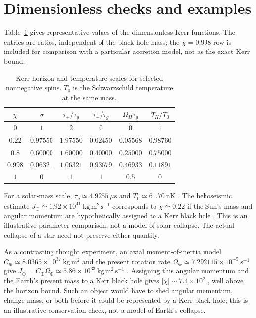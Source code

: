 \documentclass[12pt]{article}
\begin{document}
\section{Dimensionless checks and examples}

Table~\ref{tab:spin-values} gives representative values of the dimensionless Kerr functions. The entries are ratios, independent of the black-hole mass; the $\chi=0.998$ row is included for comparison with a particular accretion model, not as the exact Kerr bound.

\begin{table}[ht]
  \centering
  \small
  \caption{Kerr horizon and temperature scales for selected nonnegative spins. $T_0$ is the Schwarzschild temperature at the same mass.}
  \label{tab:spin-values}
  \begin{tabular}{cccccc}
    \toprule
    $\chi$ & $\sigma$ & $\tau_+/\tau_g$ & $\tau_-/\tau_g$ & $\Omega_H\tau_g$ & $T_H/T_0$ \\
    \midrule
    $0$ & $1$ & $2$ & $0$ & $0$ & $1$ \\
    $0.22$ & $0.97550$ & $1.97550$ & $0.02450$ & $0.05568$ & $0.98760$ \\
    $0.8$ & $0.60000$ & $1.60000$ & $0.40000$ & $0.25000$ & $0.75000$ \\
    $0.998$ & $0.06321$ & $1.06321$ & $0.93679$ & $0.46933$ & $0.11891$ \\
    $1$ & $0$ & $1$ & $1$ & $0.5$ & $0$ \\
    \bottomrule
  \end{tabular}
\end{table}

For a solar-mass scale, $\tau_g\simeq4.9255\ \mu\mathrm{s}$ and $T_0\simeq61.70\ \mathrm{nK}$ \cite{JPL}. The helioseismic estimate $J_\odot\simeq1.92\times10^{41}\ \mathrm{kg\,m^2\,s^{-1}}$ corresponds to $\chi\simeq0.22$ if the Sun's mass and angular momentum are hypothetically assigned to a Kerr black hole \cite{Iorio,JPL,CODATA}. This is an illustrative parameter comparison, not a model of solar collapse. The actual collapse of a star need not preserve either quantity.

As a contrasting thought experiment, an axial moment-of-inertia model $C_\oplus\simeq8.0365\times10^{37}\ \mathrm{kg\,m^2}$ and the present rotation rate $\Omega_\oplus\simeq7.292115\times10^{-5}\ \mathrm{s^{-1}}$ give $J_\oplus=C_\oplus\Omega_\oplus\simeq5.86\times10^{33}\ \mathrm{kg\,m^2\,s^{-1}}$ \cite{IERS}. Assigning this angular momentum and the Earth's present mass to a Kerr black hole gives $|\chi|\sim7.4\times10^2$ \cite{JPL,CODATA}, well above the horizon bound. Such an object would have to shed angular momentum, change mass, or both before it could be represented by a Kerr black hole; this is an illustrative conservation check, not a model of Earth's collapse.
\end{document}
